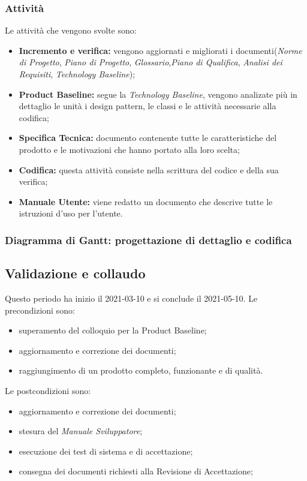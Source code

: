 \subsubsection{Attività}
Le attività che vengono svolte sono:
\begin{itemize}
	\item \textbf{Incremento e verifica:} vengono aggiornati e migliorati i documenti(\textit{Norme di Progetto}, \textit{Piano di Progetto}, \textit{Glossario},\textit{Piano di Qualifica}, \textit{Analisi dei Requisiti}, \textit{Technology Baseline});
	\item \textbf{Product Baseline:} segue la \textit{Technology Baseline}, vengono analizate più in dettaglio le unità i design pattern, le classi e le attività necessarie alla codifica;
	\item \textbf{Specifica Tecnica:} documento contenente tutte le caratteristiche del prodotto e le motivazioni che hanno portato alla loro scelta;
	\item \textbf{Codifica:} questa attività consiste nella scrittura del codice e della sua verifica;
	\item \textbf{Manuale Utente:} viene redatto un documento che descrive tutte le istruzioni d'uso per l'utente.
\end{itemize}
\subsubsection{Diagramma di Gantt: progettazione di dettaglio e codifica}

\newpage
\subsection{Validazione e collaudo}
Questo periodo ha inizio il 2021-03-10 e si conclude il 2021-05-10.
Le precondizioni sono:
\begin{itemize}
	\item superamento del colloquio per la Product Baseline;
	\item aggiornamento e correzione dei documenti;
	\item raggiungimento di un prodotto completo, funzionante e di qualità.
\end{itemize}
Le postcondizioni sono:
\begin{itemize}
	\item aggiornamento e correzione dei documenti;
	\item stesura del \textit{Manuale Sviluppatore};
	\item esecuzione dei test di sistema e di accettazione;
	\item consegna dei documenti richiesti alla Revisione di Accettazione;
\end{itemize}

